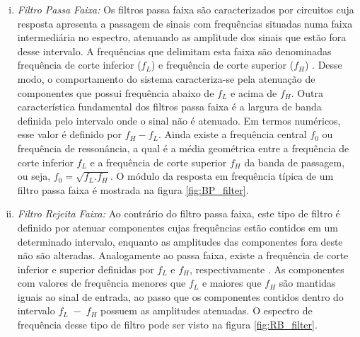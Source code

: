 \begin{enumerate}[i),leftmargin=1.75cm,itemindent=0cm]
	\item 
	\textit{Filtro Passa Faixa:} Os filtros passa faixa são caracterizados por circuitos cuja resposta apresenta a passagem de sinais com frequências situadas numa faixa intermediária no espectro, atenuando as amplitude dos sinais que estão fora desse intervalo. A frequências que delimitam esta faixa são denominadas frequência de corte inferior ($f_L$) e frequência de corte superior ($f_H$) \cite{Mussoi2004}. Desse modo, o comportamento do sistema caracteriza-se pela atenuação de componentes que possui frequência abaixo de $f_L$ e acima de $f_H$. Outra característica fundamental dos filtros passa faixa é a largura de banda definida pelo intervalo onde o sinal não é atenuado. Em termos numéricos, esse valor é definido por $f_H-f_L$. Ainda existe a frequência central $f_0$ ou frequência de ressonância, a qual é a média geométrica entre a frequência de corte inferior $f_L$ e a frequência de corte superior $f_H$ da banda de passagem, ou seja, $f_0=\sqrt{f_L.f_H}$. O módulo da resposta em frequência típica de um filtro passa faixa é mostrada na figura \ref{fig:BP_filter}.
		
	\item 
	\textit{Filtro Rejeita Faixa:} Ao contrário do filtro passa faixa, este tipo de filtro é definido por atenuar componentes cujas frequências estão contidos em um determinado intervalo, enquanto as amplitudes das componentes fora deste não são alteradas.  Analogamente ao passa faixa, existe a frequência de corte inferior e superior definidas por $f_L$ e $f_H$, respectivamente \cite{Mussoi2004}. As componentes com valores de frequência menores que $f_L$ e maiores que $f_H$ são mantidas iguais ao sinal de entrada, ao passo que os componentes contidos dentro do intervalo $f_L\;-\;f_H$ possuem as amplitudes atenuadas. O espectro de frequência desse tipo de filtro pode ser visto na figura \ref{fig:RB_filter}.
		

\end{enumerate}
